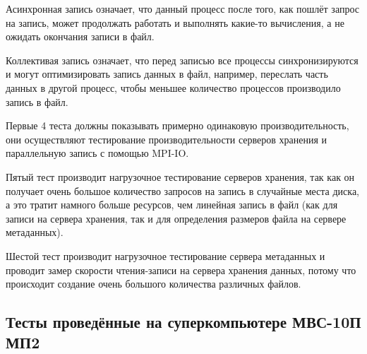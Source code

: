 Асинхронная запись означает, что данный процесс после того, как пошлёт запрос на запись,
может продолжать работать и выполнять какие-то вычисления, а не ожидать окончания записи в файл.

Коллективая запись означает, что перед записью все процессы синхронизируются и могут
оптимизировать запись данных в файл, например, переслать часть данных в другой процесс,
чтобы меньшее количество процессов производило запись в файл.

Первые 4 теста должны показывать примерно одинаковую производительность, они осуществляют тестирование производительности серверов хранения и параллельную запись с помощью MPI-IO.

Пятый тест производит нагрузочное тестирование серверов хранения, так как он получает очень
большое количество запросов на запись в случайные места диска, а это тратит намного больше ресурсов,
чем линейная запись в файл (как для записи на сервера хранения, так и для определения размеров
файла на сервере метаданных).

Шестой тест производит нагрузочное тестирование сервера метаданных и проводит замер скорости
чтения-записи на сервера хранения данных, потому что происходит создание очень большого количества различных файлов.

\subsection{Тесты проведённые на суперкомпьютере МВС-10П МП2}

